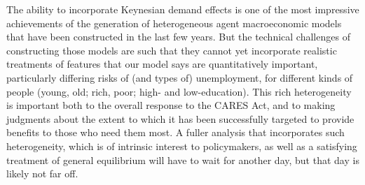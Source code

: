 \documentclass[titlepage,a4paper]{\econtex}
\providecommand{\texname}{ConsumptionResponse}%
\begin{document}
The ability to incorporate Keynesian demand effects is one of the most impressive achievements of the generation of heterogeneous agent macroeconomic models that have been constructed in the last few years.
But the technical challenges of constructing those models are such that they cannot yet incorporate realistic treatments of features that our model says are quantitatively important, particularly differing risks of (and types of) unemployment, for different kinds of people (young, old; rich, poor; high- and low-education).
This rich heterogeneity is important both to the overall response to the CARES Act, and to making judgments about the extent to which it has been successfully targeted to provide benefits to those who need them most.
A fuller analysis that incorporates such heterogeneity, which is of intrinsic interest to policymakers, as well as a satisfying treatment of general equilibrium will have to wait for another day, but that day is likely not far off.


\pagebreak

\small

\normalsize


\pagebreak
\appendix
\setcounter{table}{0}
\renewcommand{\thetable}{A\arabic{table}}

\renewcommand{\onlyinsubfile}[1]{}
\renewcommand{\notinsubfile}[1]{#1}



\end{document}
